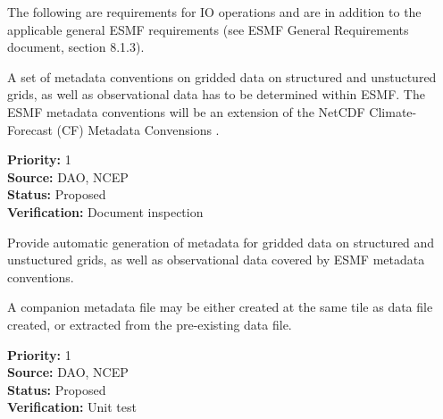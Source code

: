 

The following are requirements for IO operations and are in addition
to the applicable general ESMF requirements (see ESMF General 
Requirements document, section 8.1.3).



A set of metadata conventions on gridded data on structured and
unstuctured grids, as well as observational data has to be determined
within ESMF. The ESMF metadata conventions will be an extension of the NetCDF 
Climate-Forecast (CF) Metadata Convensions \cite{NetCDF_CF_v1_beta3}.


\begin{reqlist}
{\bf Priority:} 1 \\
{\bf Source:} DAO, NCEP \\
{\bf Status:} Proposed \\
{\bf Verification:} Document inspection \\
\end{reqlist}


Provide automatic generation of metadata for gridded data on structured and
unstuctured grids, as well as observational data covered by ESMF metadata 
conventions.

A companion metadata file may be either created at the same tile as data file 
created, or extracted from the pre-existing data file.


\begin{reqlist}
{\bf Priority:} 1 \\
{\bf Source:} DAO, NCEP \\
{\bf Status:} Proposed \\
{\bf Verification:} Unit test \\
\end{reqlist}





